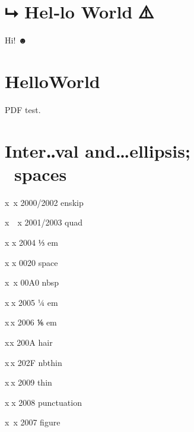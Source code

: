 \documentclass{article}%
\begin{document}
\section{⮡ Hel‑lo World ⚠}

Hi! ☻

\makeatletter%
\section{\unicodepointsUni@tarentPfeil{} Hel\unicodepoints@nbdash{}lo\underbar{}World \unicodepoints@warn{}}
\makeatother%

 PDF test.

\section{Inter‥val and…ellipsis;            spaces}

{\Huge x x} 2000/2002 enskip

{\Huge x x} 2001/2003 quad

{\Huge x x} 2004 ⅓ em

{\Huge x x} 0020 space

{\Huge x x} 00A0 nbsp

{\Huge x x} 2005 ¼ em

{\Huge x x} 2006 ⅙ em

{\Huge x x} 200A hair

{\Huge x x} 202F nbthin

{\Huge x x} 2009 thin

{\Huge x x} 2008 punctuation

{\Huge x x} 2007 figure
\end{document}
